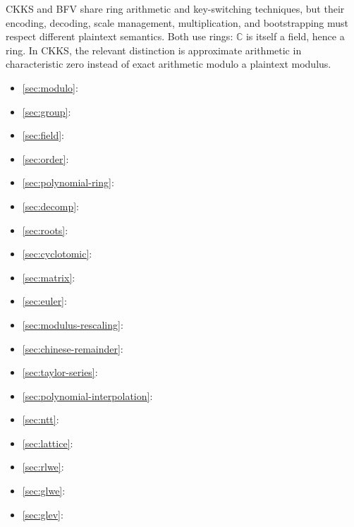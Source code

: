 CKKS and BFV share ring arithmetic and key-switching techniques, but their encoding, decoding, scale management, multiplication, and bootstrapping must respect different plaintext semantics. Both use rings: $\mathbb{C}$ is itself a field, hence a ring. In CKKS, the relevant distinction is approximate arithmetic in characteristic zero instead of exact arithmetic modulo a plaintext modulus.



\begin{tcolorbox}[
    title = \textbf{Required Background},    %
    colback = white,    %
    colframe = black,  %
    boxrule = 0.8pt,     %
    left = 1mm, right = 1mm, top = 1mm, bottom = 1mm %
]

\begin{itemize}
\item \autoref{sec:modulo}: 
\item \autoref{sec:group}: 
\item \autoref{sec:field}: 
\item \autoref{sec:order}: 
\item \autoref{sec:polynomial-ring}: 
\item \autoref{sec:decomp}: 
\item \autoref{sec:roots}: 
\item \autoref{sec:cyclotomic}: 
\item \autoref{sec:matrix}: 
\item \autoref{sec:euler}: 
\item \autoref{sec:modulus-rescaling}: 
\item \autoref{sec:chinese-remainder}: 
\item \autoref{sec:taylor-series}: 
\item \autoref{sec:polynomial-interpolation}: 
\item \autoref{sec:ntt}: 
\item \autoref{sec:lattice}: 
\item \autoref{sec:rlwe}: 
\item \autoref{sec:glwe}: 
\item \autoref{sec:glev}: 

\end{itemize}
\end{tcolorbox}
